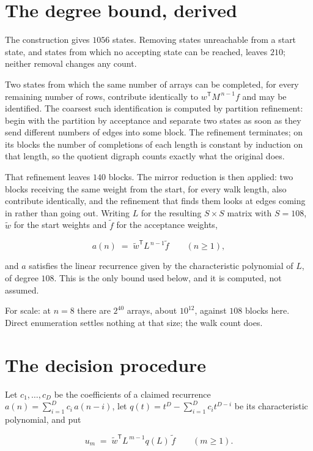 \documentclass[11pt]{article}
\theoremstyle{definition}
\begin{document}
\section{The degree bound, derived}

The construction gives $1056$ states. Removing states unreachable from a start state, and states from which no accepting state can be reached, leaves $210$; neither removal changes any count.

Two states from which the same number of arrays can be completed, for every remaining number of rows, contribute identically to $w^{\mathsf T}M^{\,n-1}f$ and may be identified. The coarsest such identification is computed by partition refinement: begin with the partition by acceptance and separate two states as soon as they send different numbers of edges into some block. The refinement terminates; on its blocks the number of completions of each length is constant by induction on that length, so the quotient digraph counts exactly what the original does.

That refinement leaves $140$ blocks. The mirror reduction is then applied: two blocks receiving the same weight from the start, for every walk length, also contribute identically, and the refinement that finds them looks at edges coming in rather than going out. Writing $L$ for the resulting $S \times S$ matrix with $S = 108$, $\tilde w$ for the start weights and $\tilde f$ for the acceptance weights,

\[a(n) \;=\; \tilde w^{\mathsf T} L^{\,n-1} \tilde f \qquad (n \ge 1),\]

and $a$ satisfies the linear recurrence given by the characteristic polynomial of $L$, of degree $108$. This is the only bound used below, and it is computed, not assumed.

For scale: at $n = 8$ there are $2^{40}$ arrays, about $10^{12}$, against $108$ blocks here. Direct enumeration settles nothing at that size; the walk count does.

\section{The decision procedure}

Let $c_1,\dots,c_D$ be the coefficients of a claimed recurrence $a(n) = \sum_{i=1}^{D} c_i\,a(n-i)$, let $q(t) = t^{D} - \sum_{i=1}^{D} c_i t^{D-i}$ be its characteristic polynomial, and put

\[u_m \;=\; \tilde w^{\mathsf T} L^{\,m-1} q(L)\,\tilde f \qquad (m \ge 1).\]
\end{document}
